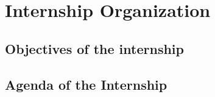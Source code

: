 \chapter*{Internship Organization}

\section{Objectives of the internship}


%
%
%
%
%


\section{Agenda of the Internship}

